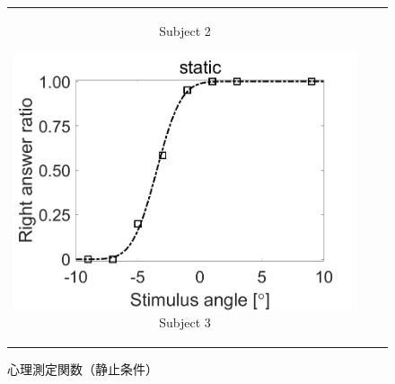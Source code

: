 \documentclass[12pt,a4j]{jsarticle}
\renewcommand{\ }{\hspace{1zw}}
\begin{document}
\begin{figure}[htbp]
\begin{tabular}{ccc}
\begin{minipage}{0.33\columnwidth}
            Subject 2
        \end{minipage}
        \begin{minipage}{0.33\columnwidth}
            \centering
            \includegraphics[width=\columnwidth]{./figure/NoMove_oikawa.png}
            Subject 3
        \end{minipage}
    \end{tabular}
    \caption{心理測定関数（静止条件）}
    \label{pf_s}
\end{figure}
\end{document}
